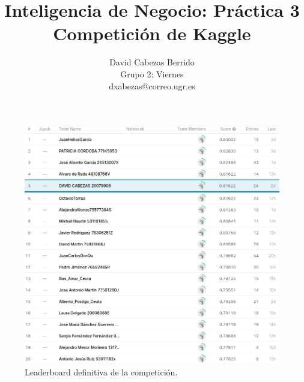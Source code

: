 \documentclass{article}
\title{\Huge Inteligencia de Negocio: Práctica 3 \\ Competición de Kaggle\vspace{10mm}}
\author{\huge David Cabezas Berrido \vspace{10mm} \\ 
  \huge Grupo 2: Viernes \vspace{10mm} \\ \huge dxabezas@correo.ugr.es \vspace{10mm}}
\begin{document}
\maketitle

\pagebreak

\begin{figure}[H]
  \centering
  \includegraphics[width=180mm]{imgs/leaderboard}
  \caption{Leaderboard definitiva de la competición.}
  \label{fig:leaderboard}
\end{figure}

\pagebreak

\tableofcontents

\pagebreak
\end{document}
